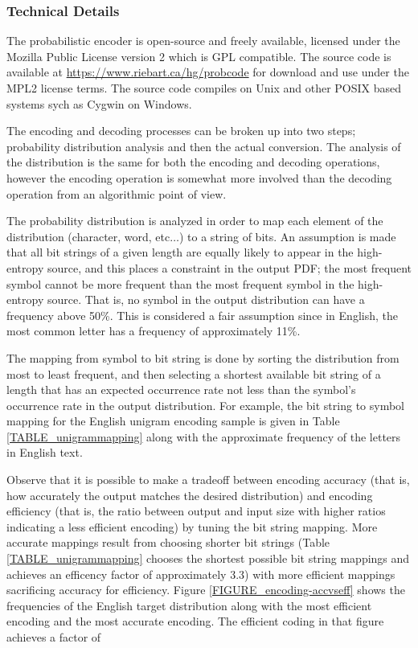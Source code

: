 \documentclass[12pt]{report}
\theoremstyle{remark}
\theoremstyle{definition}
\theoremstyle{definition}
\theoremstyle{definition}
\begin{document}
\subsubsection{Technical Details}
The probabilistic encoder is open-source and freely available, licensed under the Mozilla Public License version 2 which is GPL compatible. The source code is available at \url{https://www.riebart.ca/hg/probcode} for download and use under the MPL2 license terms. The source code compiles on Unix and other POSIX based systems sych as Cygwin on Windows.

The encoding and decoding processes can be broken up into two steps; probability distribution analysis and then the actual conversion. The analysis of the distribution is the same for both the encoding and decoding operations, however the encoding operation is somewhat more involved than the decoding operation from an algorithmic point of view.

The probability distribution is analyzed in order to map each element of the distribution (character, word, etc$\ldots$) to a string of bits. An assumption is made that all bit strings of a given length are equally likely to appear in the high-entropy source, and this places a constraint in the output PDF; the most frequent symbol cannot be more frequent than the most frequent symbol in the high-entropy source. That is, no symbol in the output distribution can have a frequency above 50\%. This is considered a fair assumption since in English, the most common letter has a frequency of approximately 11\%.

The mapping from symbol to bit string is done by sorting the distribution from most to least frequent, and then selecting a shortest available bit string of a length that has an expected occurrence rate not less than the symbol's occurrence rate in the output distribution. For example, the bit string to symbol mapping for the English unigram encoding sample is given in Table \ref{TABLE_unigrammapping} along with the approximate frequency of the letters in English text.

Observe that it is possible to make a tradeoff between encoding accuracy (that is, how accurately the output matches the desired distribution) and encoding efficiency (that is, the ratio between output and input size with higher ratios indicating a less efficient encoding) by tuning the bit string mapping. More accurate mappings result from choosing shorter bit strings (Table \ref{TABLE_unigrammapping} chooses the shortest possible bit string mappings and achieves an efficency factor of approximately 3.3) with more efficient mappings sacrificing accuracy for efficiency. Figure \ref{FIGURE_encoding-accvseff} shows the frequencies of the English target distribution along with the most efficient encoding and the most accurate encoding. The efficient coding in that figure achieves a factor of 
\end{document}
